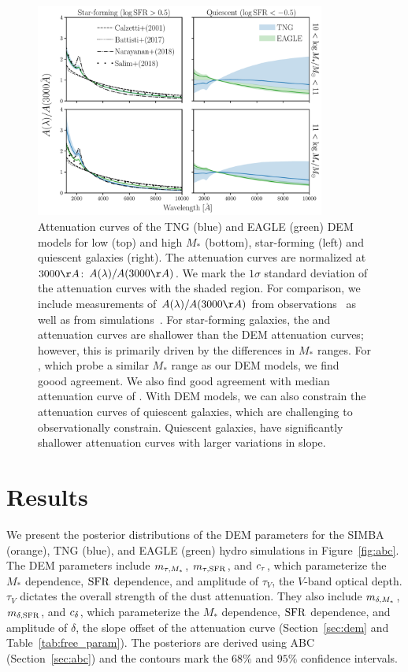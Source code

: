 \begin{figure}
\begin{center}
    \includegraphics[width=0.85\textwidth]{figs/abc_attenuation.pdf}
    \caption{\label{fig:atten}
    Attenuation curves of the TNG (blue) and EAGLE (green) DEM models for 
    low (top) and high $M_*$ (bottom), star-forming (left) and
    quiescent galaxies (right). The attenuation curves are normalized at
    $3000\AA$: $A(\lambda)/A(3000\AA)$. We mark the $1\sigma$ standard
    deviation of the attenuation curves with the shaded region. For comparison,
    we include measurements of $A(\lambda)/A(3000\AA)$ from 
    observations~\citep{caleztti2000, battisti2017, salim2018} as well as
    from simulations~\citep{narayanan2018}. For star-forming galaxies, the 
    \cite{calzetti2000} and \cite{battisti2017} attenuation curves are shallower 
    than the DEM attenuation curves; however, this is primarily driven by the
    differences in $M_*$ ranges. For \cite{salim2018}, which probe a similar
    $M_*$ range as our DEM models, we find goood agreement. We also find good 
    agreement with median attenuation curve of \cite{narayanan2018}. With DEM
    models, we can also constrain the attenuation curves of quiescent galaxies,
    which are challenging to observationally constrain. Quiescent galaxies,
    have significantly shallower attenuation curves with larger variations in
    slope. 
    }
\end{center}
\end{figure}

\section{Results} \label{sec:results}
We present the posterior distributions of the DEM parameters for the SIMBA
(orange), TNG (blue), and EAGLE (green) hydro simulations in
Figure~\ref{fig:abc}. The DEM parameters include $m_{\tau,M_*}$, $m_{\tau,{\rm SFR}}$, and
$c_\tau$, which parameterize the $M_*$ dependence, ${\rm SFR}$ dependence, and 
amplitude of $\tau_V$, the $V$-band optical depth. $\tau_V$ dictates the
overall strength of the dust attenuation. They also include $m_{\delta,M_*}$,
$m_{\delta,{\rm SFR}}$, and $c_\delta$, which parameterize the $M_*$ dependence, ${\rm SFR}$ dependence,
and amplitude of $\delta$, the slope offset of the attenuation curve
(Section~\ref{sec:dem} and Table~\ref{tab:free_param}). The posteriors 
are derived using ABC (Section~\ref{sec:abc}) and the contours mark the 
$68\%$ and $95\%$ confidence intervals. 


